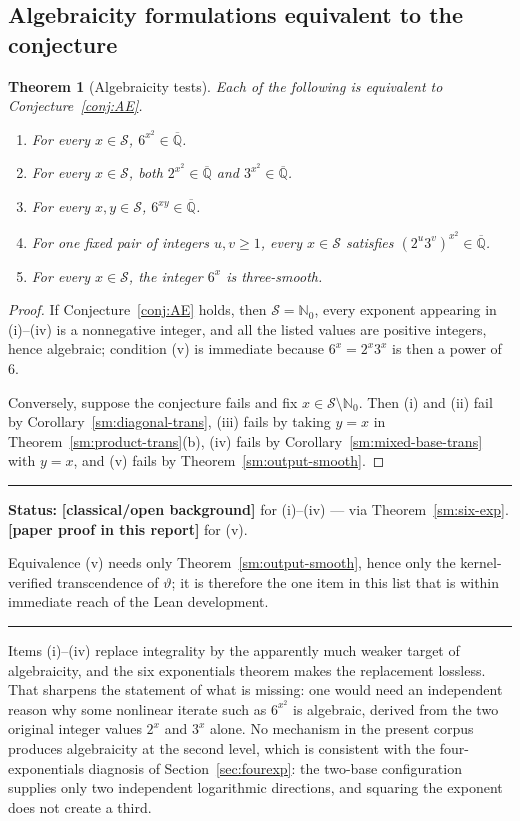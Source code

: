 \documentclass[11pt,oneside]{article}
\newtheorem{theorem}{Theorem}[section]
\theoremstyle{definition}
\theoremstyle{remark}
\newcommand{\Nzero}{\mathbb N_0}
\newcommand{\Abar}{\overline{\mathbb Q}}
\newcommand{\thetaq}{\vartheta}
\newcommand{\Sol}{\mathcal S}
\newcommand{\statusnew}{\textcolor{newgreen}{\textbf{[paper proof in this report]}}}
\newcommand{\statusknown}{\textcolor{classicalgray}{\textbf{[classical/open background]}}}
\newenvironment{statusbox}[1]
{\begin{center}\begin{minipage}{0.94\textwidth}\raggedright\hbadness=10000\hrule
\vspace{0.45em}\textbf{Status:} #1\par\vspace{0.35em}}
{\vspace{0.35em}\hrule\end{minipage}\end{center}}
\begin{document}
\subsection{Algebraicity formulations equivalent to the conjecture}

\begin{theorem}[Algebraicity tests]
\label{sm:algebraicity}
Each of the following is equivalent to Conjecture~\ref{conj:AE}.
\begin{enumerate}[label=\textup{(\roman*)}]
\item For every $x\in\Sol$, $6^{x^2}\in\Abar$.
\item For every $x\in\Sol$, both $2^{x^2}\in\Abar$ and $3^{x^2}\in\Abar$.
\item For every $x,y\in\Sol$, $6^{xy}\in\Abar$.
\item For one fixed pair of integers $u,v\ge1$, every $x\in\Sol$ satisfies
$(2^u3^v)^{x^2}\in\Abar$.
\item For every $x\in\Sol$, the integer $6^x$ is three-smooth.
\end{enumerate}
\end{theorem}

\begin{proof}
If Conjecture~\ref{conj:AE} holds, then $\Sol=\Nzero$, every exponent appearing in
(i)--(iv) is a nonnegative integer, and all the listed values are positive integers, hence
algebraic; condition (v) is immediate because $6^x=2^x3^x$ is then a power of $6$.

Conversely, suppose the conjecture fails and fix $x\in\Sol\setminus\Nzero$.  Then (i) and
(ii) fail by Corollary~\ref{sm:diagonal-trans}, (iii) fails by taking $y=x$ in
Theorem~\ref{sm:product-trans}(b), (iv) fails by Corollary~\ref{sm:mixed-base-trans} with
$y=x$, and (v) fails by Theorem~\ref{sm:output-smooth}.
\end{proof}

\begin{statusbox}{\statusknown{} for (i)--(iv) --- via Theorem~\ref{sm:six-exp}.
\statusnew{} for (v).}
Equivalence (v) needs only Theorem~\ref{sm:output-smooth}, hence only the kernel-verified
transcendence of $\thetaq$; it is therefore the one item in this list that is within
immediate reach of the Lean development.
\end{statusbox}

Items (i)--(iv) replace integrality by the apparently much weaker target of algebraicity, and
the six exponentials theorem makes the replacement lossless.  That sharpens the statement of
what is missing: one would need an independent reason why some nonlinear iterate such as
$6^{x^2}$ is algebraic, derived from the two original integer values $2^x$ and $3^x$ alone.
No mechanism in the present corpus produces algebraicity at the second level, which is
consistent with the four-exponentials diagnosis of Section~\ref{sec:fourexp}: the two-base
configuration supplies only two independent logarithmic directions, and squaring the exponent
does not create a third.
\end{document}
